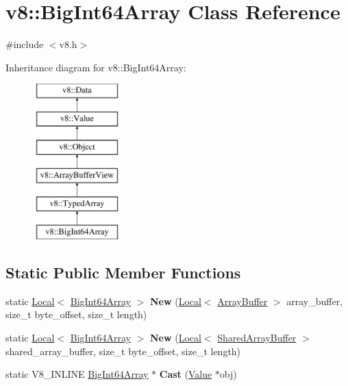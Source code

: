 \hypertarget{classv8_1_1BigInt64Array}{}\section{v8\+:\+:Big\+Int64\+Array Class Reference}
\label{classv8_1_1BigInt64Array}


{\ttfamily \#include $<$v8.\+h$>$}

Inheritance diagram for v8\+:\+:Big\+Int64\+Array\+:\begin{figure}[H]
\begin{center}
\leavevmode
\includegraphics[height=6.000000cm]{classv8_1_1BigInt64Array}
\end{center}
\end{figure}
\subsection*{Static Public Member Functions}
\begin{DoxyCompactItemize}
\item 
\mbox{\label{classv8_1_1BigInt64Array_a6f8331c7a7e8f3e76efa64016941d789}} 
static \mbox{\hyperlink{classv8_1_1Local}{Local}}$<$ \mbox{\hyperlink{classv8_1_1BigInt64Array}{Big\+Int64\+Array}} $>$ {\bfseries New} (\mbox{\hyperlink{classv8_1_1Local}{Local}}$<$ \mbox{\hyperlink{classv8_1_1ArrayBuffer}{Array\+Buffer}} $>$ array\+\_\+buffer, size\+\_\+t byte\+\_\+offset, size\+\_\+t length)
\item 
\mbox{\label{classv8_1_1BigInt64Array_ac25328514d8f163e92360b3b921e95f5}} 
static \mbox{\hyperlink{classv8_1_1Local}{Local}}$<$ \mbox{\hyperlink{classv8_1_1BigInt64Array}{Big\+Int64\+Array}} $>$ {\bfseries New} (\mbox{\hyperlink{classv8_1_1Local}{Local}}$<$ \mbox{\hyperlink{classv8_1_1SharedArrayBuffer}{Shared\+Array\+Buffer}} $>$ shared\+\_\+array\+\_\+buffer, size\+\_\+t byte\+\_\+offset, size\+\_\+t length)
\item 
\mbox{\label{classv8_1_1BigInt64Array_a7530edf62ef0b242da378e886256f8da}} 
static V8\+\_\+\+I\+N\+L\+I\+NE \mbox{\hyperlink{classv8_1_1BigInt64Array}{Big\+Int64\+Array}} $\ast$ {\bfseries Cast} (\mbox{\hyperlink{classv8_1_1Value}{Value}} $\ast$obj)
\end{DoxyCompactItemize}
